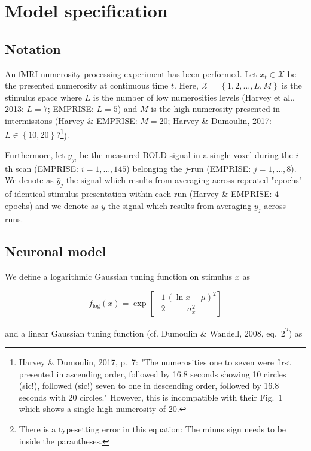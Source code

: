 \documentclass[a4paper,12pt]{article}
\begin{document}
\section{Model specification} \label{sec:Mod}

\subsection{Notation}

An fMRI numerosity processing experiment has been performed. Let $x_t \in \mathcal{X}$ be the presented numerosity at continuous time $t$. Here, $\mathcal{X} = \left\lbrace 1, 2, \ldots, L, M \right\rbrace$ is the stimulus space where $L$ is the number of low numerosities levels (Harvey et al., 2013: $L = 7$; EMPRISE: $L = 5$) and $M$ is the high numerosity presented in intermissions (Harvey \& EMPRISE: $M = 20$; Harvey \& Dumoulin, 2017: $L \in \left\lbrace 10, 20 \right\rbrace$?\footnote{Harvey \& Dumoulin, 2017, p.~7: "The numerosities one to seven were first presented in ascending order, followed by 16.8 seconds showing 10 circles (sic!), followed (sic!) seven to one in descending order, followed by 16.8 seconds with 20 circles." However, this is incompatible with their Fig.~1 which shows a single high numerosity of 20.}).

Furthermore, let $y_{ji}$ be the measured BOLD signal in a single voxel during the $i$-th scan (EMPRISE: $i = 1,\ldots,145$) belonging the $j$-run (EMPRISE: $j = 1,\ldots,8$). We denote as $\bar{y}_j$ the signal which results from averaging across repeated "epochs" of identical stimulus presentation within each run (Harvey \& EMPRISE: 4 epochs) and we denote as $\bar{y}$ the signal which results from averaging $\bar{y}_j$ across runs.


\subsection{Neuronal model}

We define a logarithmic Gaussian tuning function on stimulus $x$ as

\begin{equation} \label{eq:f-log}
f_\mathrm{log}(x) = \exp \left[ -\frac{1}{2} \frac{(\ln x - \mu)^2}{\sigma_x^2} \right]
\end{equation}

and a linear Gaussian tuning function (cf. Dumoulin \& Wandell, 2008, eq.~2\footnote{There is a typesetting error in this equation: The minus sign needs to be inside the parantheses.}) as 
\end{document}
